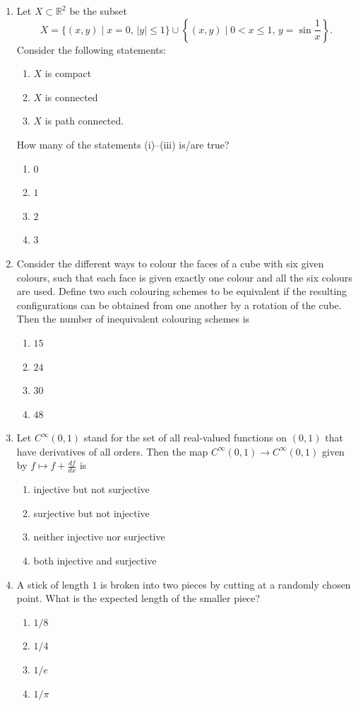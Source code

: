 \documentclass[11pt, a4paper]{article}
\begin{document}
\begin{enumerate}
  \item Let $X \subset \mathbb{R}^2$ be the subset
  \[
    X = \{(x, y) \mid x = 0, \, |y| \le 1\} \cup \left\{(x, y) \mid 0 < x \le 1, \, y = \sin\frac{1}{x}\right\}.
  \]
  Consider the following statements:
  \begin{enumerate}[label=(\roman*)]
    \item $X$ is compact
    \item $X$ is connected
    \item $X$ is path connected.
  \end{enumerate}
  How many of the statements (i)--(iii) is/are true?
  \begin{enumerate}[label=(\alph*)]
    \item $0$
    \item $1$
    \item $2$
    \item $3$
  \end{enumerate}

  \item Consider the different ways to colour the faces of a cube with six given colours, such that each face is given exactly one colour and all the six colours are used. Define two such colouring schemes to be equivalent if the resulting configurations can be obtained from one another by a rotation of the cube. Then the number of inequivalent colouring schemes is
  \begin{enumerate}[label=(\alph*)]
    \item $15$
    \item $24$
    \item $30$
    \item $48$
  \end{enumerate}

  \item Let $C^\infty(0,1)$ stand for the set of all real-valued functions on $(0,1)$ that have derivatives of all orders. Then the map $C^\infty(0,1) \to C^\infty(0,1)$ given by $f \mapsto f + \frac{df}{dx}$ is
  \begin{enumerate}[label=(\alph*)]
    \item injective but not surjective
    \item surjective but not injective
    \item neither injective nor surjective
    \item both injective and surjective
  \end{enumerate}

  \item A stick of length $1$ is broken into two pieces by cutting at a randomly chosen point. What is the expected length of the smaller piece?
  \begin{enumerate}[label=(\alph*)]
    \item $1/8$
    \item $1/4$
    \item $1/e$
    \item $1/\pi$
  \end{enumerate}
\end{enumerate}
\end{document}
